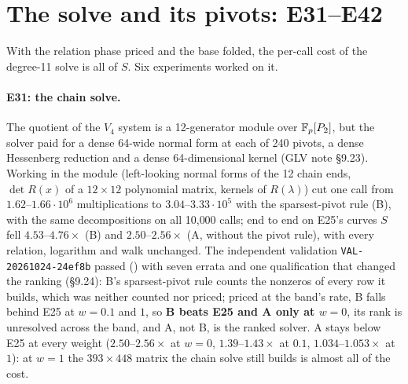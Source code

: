 \section{The solve and its pivots: E31--E42}\label{sec:glv-chain}

With the relation phase priced and the base folded, the per-call cost of the
degree-11 solve is all of $S$. Six experiments worked on it.

\paragraph{E31: the chain solve.} The quotient of the $V_4$ system is a
12-generator module over $\mathbb{F}_p[P_2]$, but the solver paid for a dense 64-wide
normal form at each of 240 pivots, a dense Hessenberg reduction and a dense
64-dimensional kernel (GLV note \S9.23). Working in the module (left-looking
normal forms of the 12 chain ends, $\det R(x)$ of a $12\times12$ polynomial
matrix, kernels of $R(\lambda)$) cut one call from $1.62$--$1.66\cdot10^6$
multiplications to $3.04$--$3.33\cdot10^5$ with the sparsest-pivot rule (B),
with the same decompositions on all 10{,}000 calls; end to end on E25's curves
$S$ fell $4.53$--$4.76\times$ (B) and $2.50$--$2.56\times$ (A, without the pivot
rule), with every relation, logarithm and walk unchanged. The independent
validation \texttt{VAL-20261024-24ef8b} passed
() with seven errata and one
qualification that changed the ranking (\S9.24): B's sparsest-pivot rule
counts the nonzeros of every row it builds, which was neither counted nor
priced; priced at the band's rate, B falls behind E25 at $w=0.1$ and $1$, so
\textbf{B beats E25 and A only at $w=0$}, its rank is unresolved across the
band, and A, not B, is the ranked solver. A stays below E25 at every weight
($2.50$--$2.56\times$ at $w=0$, $1.39$--$1.43\times$ at $0.1$, $1.034$--$1.053\times$
at $1$): at $w=1$ the $393\times448$ matrix the chain solve still builds is almost
all of the cost.

